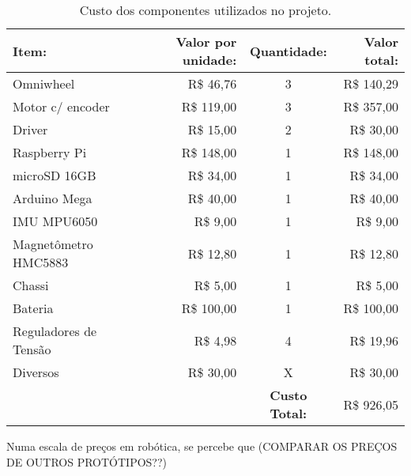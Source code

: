 \begin{table}
  \caption{Custo dos componentes utilizados no projeto.}
  \begin{tabular}{||l r c r||}
     \hline
     \textbf{Item:}   & \textbf{Valor por unidade:} & \textbf{Quantidade:} & \textbf{Valor total:} \\ \hline\hline
     Omniwheel        & R\$ 46,76                   &  3                   & R\$ 140,29            \\ \hline
     Motor c/ encoder & R\$ 119,00                  &  3                   & R\$ 357,00            \\ \hline
     Driver           & R\$ 15,00                   &  2                   & R\$ 30,00             \\ \hline
     Raspberry Pi     & R\$ 148,00                  &  1                   & R\$ 148,00            \\ \hline
     microSD 16GB     & R\$ 34,00                   &  1                   & R\$ 34,00             \\ \hline
     Arduino Mega     & R\$ 40,00                   &  1                   & R\$ 40,00             \\ \hline
     IMU MPU6050      & R\$ 9,00                    &  1                   & R\$ 9,00              \\ \hline
     Magnetômetro HMC5883 & R\$ 12,80               &  1                   & R\$ 12,80             \\ \hline
     Chassi           & R\$ 5,00                    &  1                   & R\$ 5,00              \\ \hline
     Bateria          & R\$ 100,00                  &  1                   & R\$ 100,00            \\ \hline
     Reguladores de Tensão & R\$ 4,98               &  4                   & R\$ 19,96             \\ \hline
     Diversos         & R\$ 30,00                   &  X                   & R\$ 30,00             \\ \hline\hline
                      &                             & \textbf{Custo Total:} & R\$ 926,05           \\ \hline
  \end{tabular}
  \label{tab:custo}
\end{table}

Numa escala de preços em robótica, se percebe que (COMPARAR OS PREÇOS DE OUTROS PROTÓTIPOS??)
